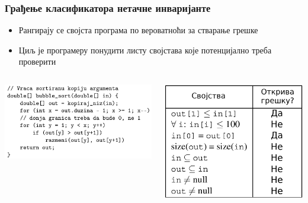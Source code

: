 \documentclass{beamer}
\begin{document}
\begin{frame}
\frametitle{Грађење класификатора нетачне инваријанте}
\begin{itemize}
    \item Рангирају се својста програма по вероватноћи за стварање грешке
    \item Циљ је програмеру понудити листу својстава које потенцијално треба проверити
\end{itemize}

\begin{columns}
\begin{column}{0.55\textwidth}
    \begin{center}
		\includegraphics[scale=0.2]{./slike/latent_code2.png}
    \end{center}
\end{column}
\begin{column}{0.45\textwidth}  %
	\begin{center}
		\includegraphics[scale=0.13]{./slike/latent_examples.png}
	\end{center}
\end{column}
\end{columns}


\end{frame}
\end{document}
